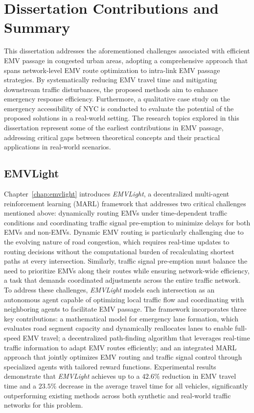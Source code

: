 \section{Dissertation Contributions and Summary}\label{sec:contributions}

This dissertation addresses the aforementioned challenges associated with efficient EMV passage in congested urban areas, adopting a comprehensive approach that spans network-level EMV route optimization to intra-link EMV passage strategies. By systematically reducing EMV travel time and mitigating downstream traffic disturbances, the proposed methods aim to enhance emergency response efficiency. Furthermore, a qualitative case study on the emergency accessibility of NYC is conducted to evaluate the potential of the proposed solutions in a real-world setting. The research topics explored in this dissertation represent some of the earliest contributions in EMV passage, addressing critical gaps between theoretical concepts and their practical applications in real-world scenarios.

\subsection{EMVLight}

Chapter~\ref{chap:emvlight} introduces \textit{EMVLight}, a decentralized multi-agent reinforcement learning (MARL) framework that addresses two critical challenges mentioned above: dynamically routing EMVs under time-dependent traffic conditions and coordinating traffic signal pre-emption to minimize delays for both EMVs and non-EMVs. Dynamic EMV routing is particularly challenging due to the evolving nature of road congestion, which requires real-time updates to routing decisions without the computational burden of recalculating shortest paths at every intersection. Similarly, traffic signal pre-emption must balance the need to prioritize EMVs along their routes while ensuring network-wide efficiency, a task that demands coordinated adjustments across the entire traffic network. To address these challenges, \textit{EMVLight} models each intersection as an autonomous agent capable of optimizing local traffic flow and coordinating with neighboring agents to facilitate EMV passage. The framework incorporates three key contributions: a mathematical model for emergency lane formation, which evaluates road segment capacity and dynamically reallocates lanes to enable full-speed EMV travel; a decentralized path-finding algorithm that leverages real-time traffic information to adapt EMV routes efficiently; and an integrated MARL approach that jointly optimizes EMV routing and traffic signal control through specialized agents with tailored reward functions. Experimental results demonstrate that \textit{EMVLight} achieves up to a $42.6\%$ reduction in EMV travel time and a $23.5\%$ decrease in the average travel time for all vehicles, significantly outperforming existing methods across both synthetic and real-world traffic networks for this problem.

